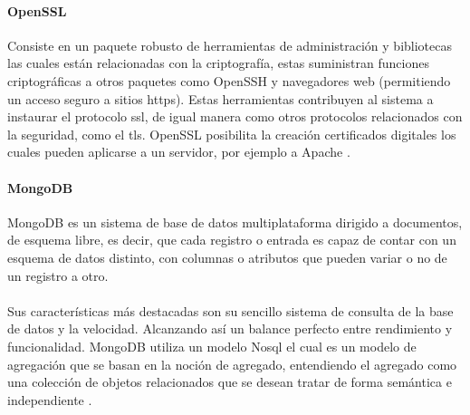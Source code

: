 \documentclass[12pt, a4paper, titlepage]{report}
\begin{document}
	   	\paragraph{OpenSSL\\}
	   	
	   	Consiste en un paquete robusto de herramientas de administración y bibliotecas las cuales están relacionadas con la criptografía, estas suministran funciones criptográficas a otros paquetes como OpenSSH y navegadores web (permitiendo un acceso seguro a sitios \acrshort{https}). Estas herramientas contribuyen al sistema a instaurar el protocolo \acrfull{ssl}, de igual manera como otros protocolos relacionados con la seguridad, como el \acrfull{tls}. OpenSSL posibilita la creación certificados digitales los cuales pueden aplicarse a un servidor, por ejemplo a Apache \cite{refopenssl}.
	   	
	   	\paragraph{MongoDB \\}
	   	MongoDB es un sistema de base de datos multiplataforma dirigido a documentos, de esquema libre, es decir, que cada registro o entrada es capaz de contar con un esquema de datos distinto, con columnas o atributos que pueden variar o no de un registro a otro.\\\\
	   	Sus características más destacadas son su sencillo sistema de consulta de la base de datos y la velocidad. Alcanzando así un balance perfecto entre rendimiento y funcionalidad. 
	   	MongoDB utiliza un modelo No\acrshort{sql} el cual es un modelo de agregación que se basan en la noción de agregado, entendiendo el agregado como una colección de objetos relacionados que se desean tratar de forma semántica e independiente \cite{refMongoDB}.
	   	
\end{document}
